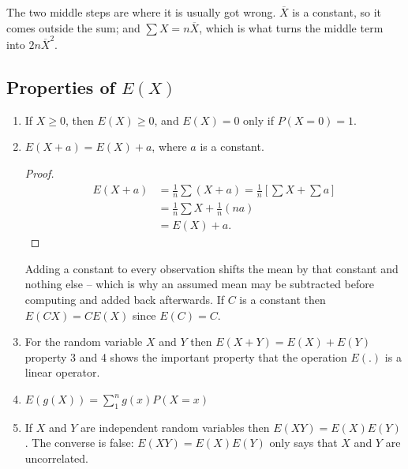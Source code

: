 \documentclass[11pt,a4paper]{article}
\theoremstyle{definition}
\begin{document}
The two middle steps are where it is usually got wrong. $\overline{X}$ is a constant, so it
comes outside the sum; and $\sum X=n\overline{X}$, which is what turns the middle term into
$2n\overline{X}^2$.


\subsection{Properties of $E(X)$}
\begin{enumerate}
\item If $X\geq 0$, then $E(X)\geq 0$, and $E(X)=0$ only if $P(X=0)=1$.
\item $E(X+a)=E(X)+a$, where $a$ is a constant.
\begin{proof}
\begin{align*}
E(X+a) &=\frac{1}{n}\sum (X+a)=\frac{1}{n}\left[\sum X+\sum a\right]\\
&=\frac{1}{n}\sum X +\frac{1}{n}(na)\\
&=E(X)+a.
\end{align*}
\end{proof}
Adding a constant to every observation shifts the mean by that constant and nothing else --
which is why an assumed mean may be subtracted before computing and added back afterwards.
If $C$ is a constant then $E(CX)=CE(X)$ since $E(C)=C$.
\item For the random variable $X$ and $Y$ then $E(X+Y)=E(X)+E(Y)$ property 3 and 4 shows the important property that the operation $E(.)$ is a linear operator.
\item $E(g(X))=\sum\limits_1^ng(x)P(X=x)$
\item If $X$ and $Y$ are independent random variables then $E(XY)=E(X)E(Y)$. The converse is false: $E(XY)=E(X)E(Y)$ only says that $X$ and $Y$ are uncorrelated.\\
\end{enumerate}
\end{document}

